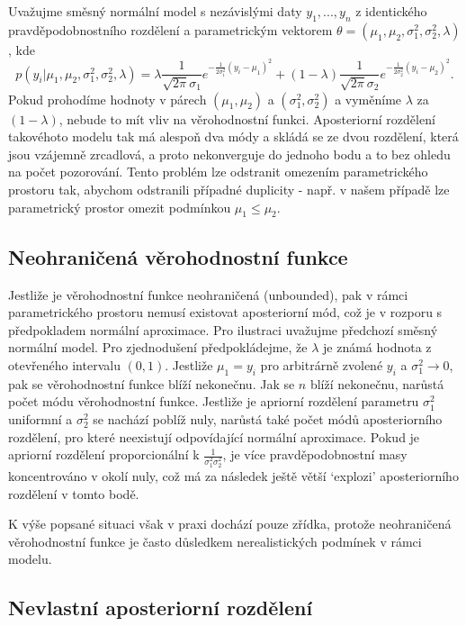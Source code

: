 Uvažujme směsný normální model s nezávislými daty $y_1, ..., y_n$ z identického pravděpodobnostního rozdělení a parametrickým vektorem $\theta = (\mu_1, \mu_2, \sigma_1^2, \sigma_2^2, \lambda)$, kde
\begin{equation}
p(y_i|\mu_1, \mu_2, \sigma_1^2, \sigma_2^2, \lambda) = \lambda \frac{1}{\sqrt{2 \pi} \sigma_1}e^{-\frac{1}{2 \sigma_1^2}(y_i - \mu_1)^2} + (1 - \lambda) \frac{1}{\sqrt{2 \pi} \sigma_2}e^{-\frac{1}{2 \sigma_2^2}(y_i - \mu_2)^2}.
\end{equation}
Pokud prohodíme hodnoty v párech $(\mu_1, \mu_2)$ a $(\sigma_1^2, \sigma_2^2)$ a vyměníme $\lambda$ za $(1 - \lambda)$, nebude to mít vliv na věrohodnostní funkci. Aposteriorní rozdělení takovéhoto modelu tak má alespoň dva módy a skládá se ze dvou rozdělení, která jsou vzájemně zrcadlová, a proto nekonverguje do jednoho bodu a to bez ohledu na počet pozorování. Tento problém lze odstranit omezením parametrického prostoru tak, abychom odstranili případné duplicity - např. v našem případě lze parametrický prostor omezit podmínkou $\mu_1 \le \mu_2$.

\subsection{Neohraničená věrohodnostní funkce}

Jestliže je věrohodnostní funkce neohraničená (unbounded), pak v rámci parametrického prostoru nemusí existovat aposteriorní mód, což je v rozporu s předpokladem normální aproximace. Pro ilustraci uvažujme předchozí směsný normální model. Pro zjednodušení předpokládejme, že $\lambda$ je známá hodnota z otevřeného intervalu $(0, 1)$. Jestliže $\mu_1 = y_i$ pro arbitrárně zvolené $y_i$ a $\sigma_1^2 \rightarrow 0$, pak se věrohodnostní funkce blíží nekonečnu. Jak se $n$ blíží nekonečnu, narůstá počet módu věrohodnostní funkce. Jestliže je apriorní rozdělení parametru $\sigma_1^2$ uniformní a $\sigma_2^2$ se nachází poblíž nuly, narůstá také počet módů aposteriorního rozdělení, pro které neexistují odpovídající normální aproximace. Pokud je apriorní rozdělení proporcionální k $\frac{1}{\sigma_1^2 \sigma_2^2}$, je více pravděpodobnostní masy koncentrováno v okolí nuly, což má za následek ještě větší `explozi' aposteriorního rozdělení v tomto bodě.

K výše popsané situaci však v praxi dochází pouze zřídka, protože neohraničená věrohodnostní funkce je často důsledkem nerealistických podmínek v rámci modelu.

\subsection{Nevlastní aposteriorní rozdělení}

